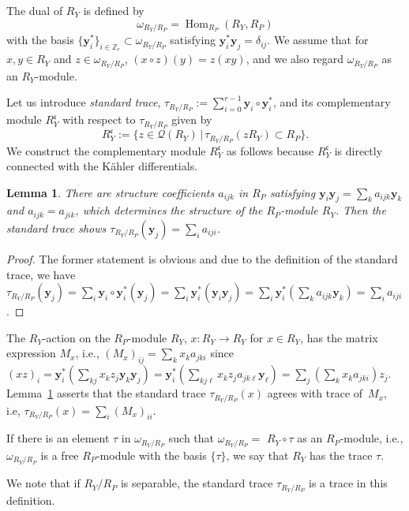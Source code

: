 \documentclass[10pt,a4paper]{amsart}
\def\ZZ{{\mathbb Z}}
\def\bby{{\mathbf y}}
\def\cQ{{\mathcal Q}}
\def\fc{{\mathfrak c}}
\numberwithin{equation}{section}
\newtheorem{Lemma}[Theorem]{Lemma}
\begin{document}
The dual of $R_Y$ is defined by
\[
\omega_{R_Y/R_P}=\operatorname{Hom}_{R_P}(R_Y, R_P)
\]
with the basis $\{\bby_i^*\}_{i\in \ZZ_r} \subset \omega_{R_Y/R_P}$ satisfying $\bby_i^*\bby_j=\delta_{i j}$.
We assume that for $x, y\in R_Y$ and $z\in \omega_{R_Y/R_P}$, $(x\circ z)(y)=z(xy)$, and we also regard $\omega_{R_Y/R_P}$ as an $R_Y$-module.


Let us introduce \emph{standard trace},
$\tau_{R_Y/R_P}:=\sum_{i=0}^{r-1}\bby_i\circ\bby_i^*$,
 and its complementary module $R_Y^\fc$ with respect to $\tau_{R_Y/R_P}$ given by
\[
R_Y^\fc:=\{z \in \cQ(R_Y) \, | \, \tau_{R_Y/R_P}(z R_Y) \subset R_P \}.
\]
We construct the complementary module $R_Y^\fc$ as follows because $R_Y^\fc$ is directly connected with the K\"ahler differentials.

\begin{Lemma}\label{2lm:trace_1.1}
There are structure coefficients $a_{i j k}$ in $R_P$ satisfying
$\bby_i \bby_j = \sum_{k} a_{i j k} \bby_k$ and ${a_{ijk}=a_{jik}}$, which determines the structure of the $R_P$-module $R_Y$.
Then the standard trace shows $\tau_{R_Y/R_P}(\bby_j)=\sum_i a_{i j i}$.
\end{Lemma}

\begin{proof}
The former statement is obvious and due to the definition of the standard trace, we have $\tau_{R_Y/R_P}(\bby_j)=\sum_{i}
\bby_i\circ \bby_i^*(\bby_j)=\sum_{i} \bby_i^*(\bby_i\bby_j) =\sum_{i} \bby_i^*(\sum_k a_{i j k} \bby_k)=\sum_i a_{i j i}$.
\end{proof}

The $R_Y$-action on the $R_P$-module $R_Y$, $x\colon R_Y \to R_Y$ for $x\in R_Y$, has the matrix expression $M_x$, i.e., $(M_x)_{ij}=\sum_k x_k a_{jki}$ since
$(xz)_i=\bby_i^*(\sum_{kj} x_k z_j\bby_k\bby_j)
=\bby_i^*(\sum_{kj\ell} x_k z_ja_{jk\ell}\bby_\ell)
=\sum_j(\sum_k x_k a_{jki}) z_j$.
Lemma~\ref{2lm:trace_1.1} asserts that the standard trace $\tau_{R_Y/R_P}(x)$ agrees with trace of~$M_x$, i.e, $\tau_{R_Y/R_P}(x)=\sum_{i} (M_x)_{ii}$.

\begin{Definition}\label{2df:trace_1.1}
If there is an element $\tau$ in $\omega_{R_Y/R_P}$ such that $\omega_{R_Y/R_P}=$ $R_Y\circ\tau$ as an $R_P$-module, i.e., $\omega_{R_Y/R_P}$ is a free $R_P$-module with the basis $\{\tau\}$, we say that $R_Y$ has the trace $\tau$.
\end{Definition}

We note that if $R_Y/R_P$ is separable, the standard trace $\tau_{R_Y/R_P}$ is a trace in this definition.
\end{document}
